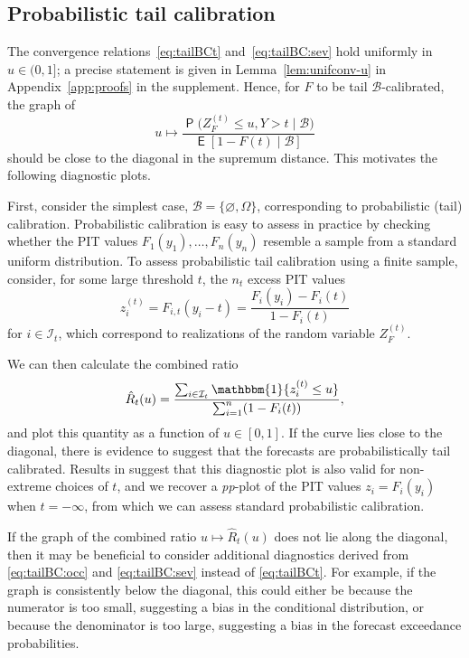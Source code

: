 \documentclass[12pt]{article}
\newcommand{\one}{\mathbbm{1}}
\newcommand{\E}{\operatorname{\mathsf{E}}}
\newcommand{\Q}{\operatorname{\mathsf{P}}}
\newcommand{\Bb}{\mathcal{B}}
\newcommand{\Ii}{\mathcal{I}}
\newcommand{\1}{\mathbf{1}} %
\newcommand{\zit}{z_{i}^{(t)}}
\newcommand{\ZFt}{Z_{F}^{(t)}} %
\theoremstyle{definition}
\begin{document}
\subsection{Probabilistic tail calibration}
\label{sec:PTCdiag}

The convergence relations~\eqref{eq:tailBCt} and~\eqref{eq:tailBC:sev} hold uniformly in $u \in (0, 1]$; a precise statement is given in Lemma~\ref{lem:unifconv-u} in Appendix~\ref{app:proofs} in the supplement. Hence, for $F$ to be tail $\Bb$-calibrated, the graph of
\[
	u \mapsto \frac{\Q\bigl(\ZFt \le u, Y > t \mid \Bb\bigr)}{\E[1-F(t)\mid \Bb]}
\]
should be close to the diagonal in the supremum distance. This motivates the following diagnostic plots.

First, consider the simplest case, $\Bb = \{\varnothing, \Omega\}$, corresponding to probabilistic (tail) calibration. Probabilistic calibration is easy to assess in practice by checking whether the PIT values $F_{1}(y_{1}), \dots, F_{n}(y_{n})$ resemble a sample from a standard uniform distribution. To assess probabilistic tail calibration using a finite sample, consider, for some large threshold $t$, the $n_{t}$ excess PIT values
\[
    \zit = F_{i, t} (y_{i} - t) = \frac{F_i(y_i)-F_i(t)}{1-F_i(t)}
\]
for $i \in \Ii_{t}$, which correspond to realizations of the random variable $\ZFt$. 

We can then calculate the combined ratio
\begin{equation}\label{eq:emp_ratio}
    \hat{R}_{t}(u) 
    = \frac{\sum_{i \in \Ii_{t}} \one\{\zit \leq u \}}{ \sum_{i = 1}^{n} (1 - F_{i}(t))},
\end{equation}
and plot this quantity as a function of $u \in [0, 1]$. If the curve lies close to the diagonal, there is evidence to suggest that the forecasts are probabilistically tail calibrated. Results in \cite{AllenEtAl2023} suggest that this diagnostic plot is also valid for non-extreme choices of $t$, and we recover a \emph{pp}-plot of the PIT values $z_i = F_i(y_i)$ when $t = -\infty$, from which we can assess standard probabilistic calibration.

If the graph of the combined ratio $u \mapsto \hat{R}_t(u)$ does not lie along the diagonal, then it may be beneficial to consider additional diagnostics derived from \eqref{eq:tailBC:occ} and \eqref{eq:tailBC:sev} instead of \eqref{eq:tailBCt}. For example, if the graph is consistently below the diagonal, this could either be because the numerator is too small, suggesting a bias in the conditional distribution, or because the denominator is too large, suggesting a bias in the forecast exceedance probabilities.
\end{document}
